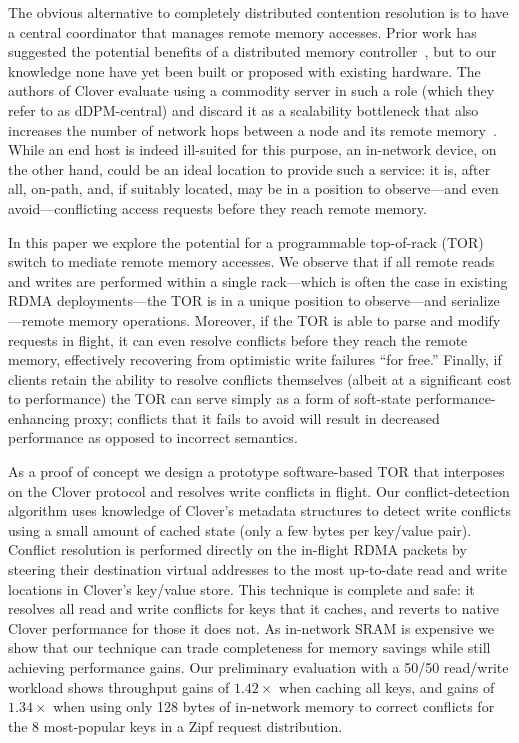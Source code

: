 The obvious alternative to completely distributed contention
resolution is to have a central coordinator that manages remote memory
accesses.  Prior work has suggested the potential benefits of a
distributed memory controller~\cite{disandapp}, but to our knowledge
none have yet been built or proposed with existing hardware.  The
authors of Clover evaluate using a commodity server in such a role
(which they refer to as dDPM-central) and discard it as a scalability
bottleneck that also increases the number of network hops between a
node and its remote memory~\cite{clover}.  While an end host is indeed
ill-suited for this purpose, an in-network device, on
the other hand, could be an ideal location to provide such a service:
it is, after all, on-path, and, if suitably located, may be in a
position to observe---and even avoid---conflicting access
requests before they reach remote memory.

In this paper we explore the potential for a programmable top-of-rack
(TOR) switch to mediate remote memory accesses.  We observe that if
all remote reads and writes are performed within a single rack---which
is often the case in existing RDMA deployments---the TOR is in a unique
position to observe---and serialize---remote memory operations.
Moreover, if the TOR is able to parse and modify requests in flight, it
can even resolve conflicts before they reach the remote memory,
effectively recovering from optimistic write failures ``for free.''
Finally, if clients retain the ability to resolve conflicts
themselves (albeit at a significant cost to performance) the TOR can
serve simply as a form of soft-state performance-enhancing proxy;
conflicts that it fails to avoid will result in
decreased performance as opposed to incorrect semantics.

As a proof of concept we design a prototype software-based TOR that
interposes on the Clover protocol and resolves write conflicts in
flight. Our conflict-detection algorithm uses knowledge of Clover's
metadata structures to detect write conflicts using a small amount of
cached state (only a few bytes per key/value pair). Conflict
resolution is performed directly on the in-flight RDMA packets by
steering their destination virtual addresses to the most up-to-date
read and write locations in Clover's key/value store. This technique
is complete and safe: it resolves all read and write conflicts for
keys that it caches, and reverts to native Clover performance for
those it does not. As in-network SRAM is expensive we show that our
technique can trade completeness for memory savings while still
achieving performance gains. Our preliminary evaluation with a 50/50
read/write workload shows throughput gains of $1.42\times$ when
caching all keys, and gains of $1.34\times$ when using only 128 bytes
of in-network memory to correct conflicts for the 8 most-popular keys
in a Zipf request distribution.
